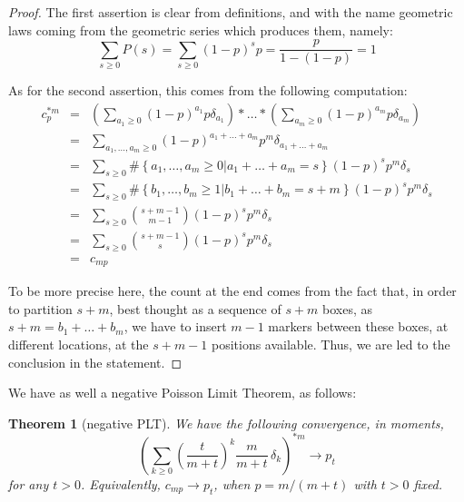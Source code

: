 \documentclass[12pt]{amsbook}
\newtheorem{theorem}{Theorem}[chapter]
\begin{document}
\begin{proof}
The first assertion is clear from definitions, and with the name geometric laws coming from the geometric series which produces them, namely:
$$\sum_{s\geq0}P(s)=\sum_{s\geq0}(1-p)^sp=\frac{p}{1-(1-p)}=1$$

As for the second assertion, this comes from the following computation:
\begin{eqnarray*}
c_p^{*m}
&=&\left(\sum_{a_1\geq0}(1-p)^{a_1}p\delta_{a_1}\right)*\ldots*\left(\sum_{a_m\geq0}(1-p)^{a_m}p\delta_{a_m}\right)\\
&=&\sum_{a_1,\ldots,a_m\geq0}(1-p)^{a_1+\ldots+a_m}p^m\delta_{a_1+\ldots+a_m}\\
&=&\sum_{s\geq0}\#\left\{a_1,\ldots,a_m\geq0\Big|a_1+\ldots+a_m=s\right\}(1-p)^sp^m\delta_s\\
&=&\sum_{s\geq0}\#\left\{b_1,\ldots,b_m\geq1\Big|b_1+\ldots+b_m=s+m\right\}(1-p)^sp^m\delta_s\\
&=&\sum_{s\geq0}\binom{s+m-1}{m-1}(1-p)^sp^m\delta_s\\
&=&\sum_{s\geq0}\binom{s+m-1}{s}(1-p)^sp^m\delta_s\\
&=&c_{mp}
\end{eqnarray*}

To be more precise here, the count at the end comes from the fact that, in order to partition $s+m$, best thought as a sequence of $s+m$ boxes, as $s+m=b_1+\ldots+b_m$, we have to insert $m-1$ markers between these boxes, at different locations, at the $s+m-1$ positions available. Thus, we are led to the conclusion in the statement.
\end{proof}

We have as well a negative Poisson Limit Theorem, as follows:


\begin{theorem}[negative PLT]
We have the following convergence, in moments,
$$\left(\sum_{k\geq0}\left(\frac{t}{m+t}\right)^k\frac{m}{m+t}\,\delta_k\right)^{*m}\to p_t$$
for any $t>0$. Equivalently, $c_{mp}\to p_t$, when $p=m/(m+t)$ with $t>0$ fixed.
\end{theorem}
\end{document}
